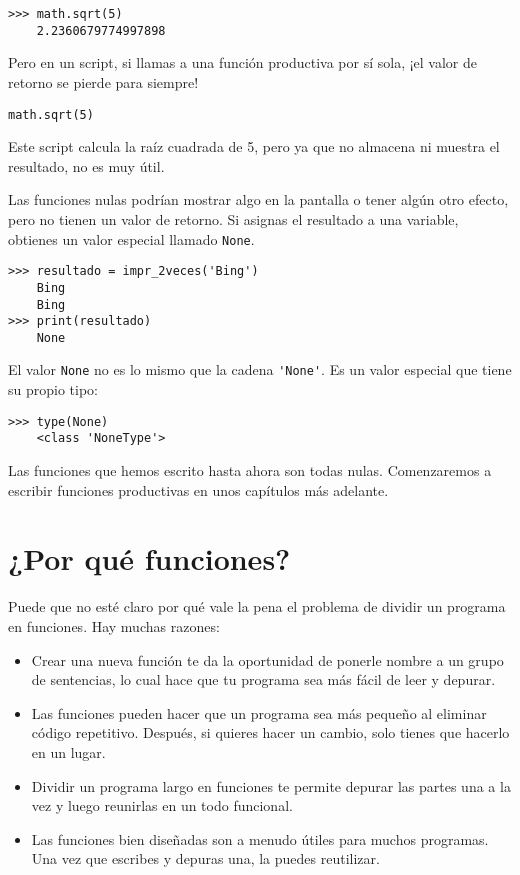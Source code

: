 \documentclass[10pt]{book}
\begin{document}
\begin{verbatim}
>>> math.sqrt(5)
    2.2360679774997898
\end{verbatim}
%
Pero en un script, si llamas a una función productiva por sí sola,
¡el valor de retorno se pierde para siempre!

\begin{verbatim}
math.sqrt(5)
\end{verbatim}
%
Este script calcula la raíz cuadrada de 5, pero ya que no almacena
ni muestra el resultado, no es muy útil.

Las funciones nulas podrían mostrar algo en la pantalla o tener algún
otro efecto, pero no tienen un valor de retorno.  Si
asignas el resultado a una variable, obtienes un valor especial llamado
{\tt None}.

\begin{verbatim}
>>> resultado = impr_2veces('Bing')
    Bing
    Bing
>>> print(resultado)
    None
\end{verbatim}
%
El valor {\tt None} no es lo mismo que la cadena \verb"'None'".
Es un valor especial que tiene su propio tipo:

\begin{verbatim}
>>> type(None)
    <class 'NoneType'>
\end{verbatim}
%
Las funciones que hemos escrito hasta ahora son todas nulas.  Comenzaremos
a escribir funciones productivas en unos capítulos más adelante.


\section{¿Por qué funciones?}

Puede que no esté claro por qué vale la pena el problema de dividir
un programa en funciones.  Hay muchas razones:

\begin{itemize}

\item Crear una nueva función te da la oportunidad de ponerle nombre a un grupo
de sentencias, lo cual hace que tu programa sea más fácil de leer y depurar.

\item Las funciones pueden hacer que un programa sea más pequeño al eliminar código
repetitivo.  Después, si quieres hacer un cambio, solo tienes
que hacerlo en un lugar.

\item Dividir un programa largo en funciones te permite depurar las
partes una a la vez y luego reunirlas en un todo funcional.

\item Las funciones bien diseñadas son a menudo útiles para muchos programas.
Una vez que escribes y depuras una, la puedes reutilizar.

\end{itemize}
\end{document}
